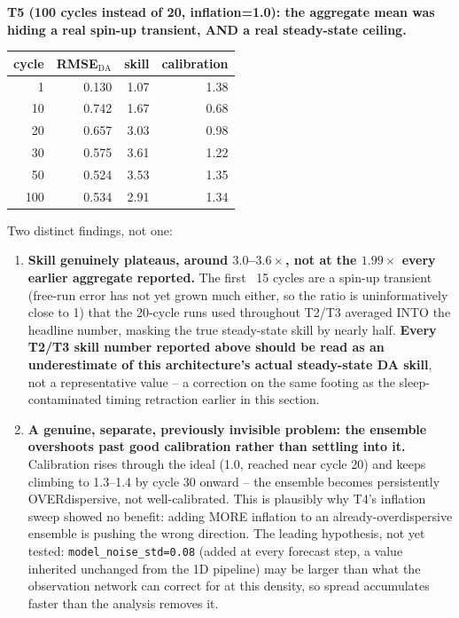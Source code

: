 \documentclass[11pt]{article}
\begin{document}
\textbf{T5 (100 cycles instead of 20, inflation=1.0): the aggregate mean
was hiding a real spin-up transient, AND a real steady-state ceiling.}
\begin{center}
\begin{tabular}{rrrr}
\toprule
cycle & RMSE$_{\mathrm{DA}}$ & skill & calibration \\
\midrule
1  & 0.130 & 1.07 & 1.38 \\
10 & 0.742 & 1.67 & 0.68 \\
20 & 0.657 & 3.03 & 0.98 \\
30 & 0.575 & 3.61 & 1.22 \\
50 & 0.524 & 3.53 & 1.35 \\
100& 0.534 & 2.91 & 1.34 \\
\bottomrule
\end{tabular}
\end{center}
Two distinct findings, not one:
\begin{enumerate}[leftmargin=*]
\item \textbf{Skill genuinely plateaus, around $3.0$--$3.6\times$, not
  at the $1.99\times$ every earlier aggregate reported.} The first ~15
  cycles are a spin-up transient (free-run error has not yet grown much
  either, so the ratio is uninformatively close to 1) that the 20-cycle
  runs used throughout T2/T3 averaged INTO the headline number, masking
  the true steady-state skill by nearly half. \textbf{Every T2/T3 skill
  number reported above should be read as an underestimate of this
  architecture's actual steady-state DA skill}, not a representative
  value -- a correction on the same footing as the sleep-contaminated
  timing retraction earlier in this section.
\item \textbf{A genuine, separate, previously invisible problem: the
  ensemble overshoots past good calibration rather than settling into
  it.} Calibration rises through the ideal (1.0, reached near cycle 20)
  and keeps climbing to 1.3--1.4 by cycle 30 onward -- the ensemble
  becomes persistently OVERdispersive, not well-calibrated. This is
  plausibly why T4's inflation sweep showed no benefit: adding MORE
  inflation to an already-overdispersive ensemble is pushing the wrong
  direction. The leading hypothesis, not yet tested: \texttt{model\_noise\_std=0.08}
  (added at every forecast step, a value inherited unchanged from the
  1D pipeline) may be larger than what the observation network can
  correct for at this density, so spread accumulates faster than the
  analysis removes it.
\end{enumerate}
\end{document}
